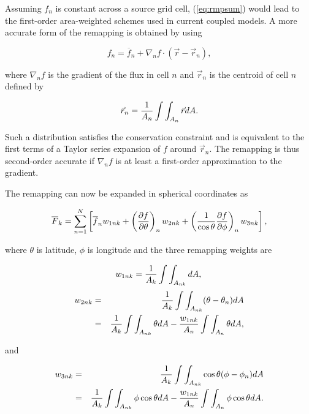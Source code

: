 \begin{description}
     Assuming $f_n$ is constant across a source grid cell, (\ref{eq:rmpsum})
     would lead to the first-order area-weighted schemes used in current coupled
     models.  A more accurate form of the remapping is obtained by using 

\begin{equation}\label{eq:gradient}
f_n = \overline{f}_n + 
                   \nabla_n f\cdot({\vec{r}} - \vec{r}_n),
\end{equation}

     where $\nabla_n f$ is the gradient of the flux in cell $n$ and $\vec{r}_n$
     is the centroid of cell $n$ defined by

 \begin{equation}\label{eq:centroid}
\vec{r}_n = {1\over{A_n}}\int\int_{A_n}\vec{r}dA.
\end{equation}

     Such a distribution satisfies the conservation constraint and is equivalent
     to the first terms of a Taylor series expansion of $f$ around $\vec{r}_n$.
     The remapping is thus second-order accurate if $\nabla_n f$ is at least a 
     first-order approximation to the gradient.

     The remapping can now be expanded in spherical coordinates as 

\begin{equation}\label{eq:remap}
\overline{F}_k = \sum_{n=1}^{N} \left[\overline{f}_n w_{1nk} + 
\left({{\partial f}\over{\partial \theta}}\right)_n w_{2nk} +
\left({1\over{\cos\theta}}{{\partial f}\over{\partial \phi}}\right)_n w_{3nk}
\right],
\end{equation}

     where $\theta$ is latitude, $\phi$ is longitude and the three remapping
     weights are

\begin{equation}\label{eq:weights1}
w_{1nk} = {1\over{A_k}}\int\int_{A_{nk}}dA, \\
\end{equation}
\begin{eqnarray}\label{eq:weights2}
w_{2nk} & = & {1\over{A_k}}\int\int_{A_{nk}}(\theta-\theta_n)dA \nonumber \\
        & = & {1\over{A_k}}\int\int_{A_{nk}}\theta dA -
              {{w_{1nk}}\over{A_n}}\int\int_{A_n}\theta dA,
\end{eqnarray}

     and

\begin{eqnarray}\label{eq:weights3}
w_{3nk} & = & {1\over{A_k}}\int\int_{A_{nk}}\cos\theta(\phi-\phi_n)dA \nonumber \\
        & = & {1\over{A_k}}\int\int_{A_{nk}}\phi\cos\theta dA -
              {{w_{1nk}}\over{A_n}}\int\int_{A_n}\phi\cos\theta dA .
\end{eqnarray}


\end{description}
